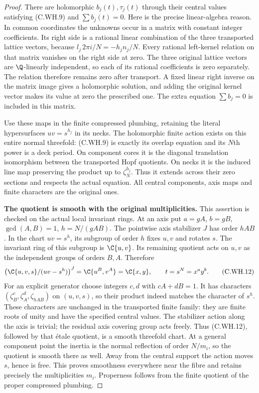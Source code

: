 \begin{proof}
There are holomorphic $b_j(t),\tau_j(t)$
through their central values satisfying
(C.WH.9) and $\sum b_j(t)=0$.
Here is the precise linear-algebra
reason. In common coordinates the
unknowns occur in a matrix with
constant integer coefficients.
Its right side is a rational linear
combination of the three transported
lattice vectors, because
$l_j\,2\pi i/N=-h_jn_j/N$.
Every rational left-kernel relation
on that matrix vanishes on the
right side at zero. The three
original lattice vectors are
$\Q$-linearly independent, so each
of its rational coefficients is
zero separately. The relation
therefore remains zero after
transport. A fixed linear right
inverse on the matrix image gives
a holomorphic solution, and adding
the original kernel vector makes
its value at zero the prescribed
one. The extra equation $\sum b_j=0$
is included in this matrix.

Use these maps in the finite
compressed plumbing, retaining the
literal hypersurfaces $uv=s^{h_j}$
in its necks. The holomorphic
finite action exists on this entire
normal threefold: (C.WH.9) is
exactly its overlap equation and
its $N$th power is a deck period.
On component cores it is the
diagonal translation isomorphism
between the transported Hopf
quotients. On necks it is the
induced line map preserving the
product up to $\zeta_N^{h_j}$.
Thus it extends across their
zero sections and respects the
actual equation. All central
components, axis maps and finite
characters are the original ones.

\par\medskip\noindent\textbf{The quotient is smooth with the original multiplicities.}
This assertion is checked on the
actual local invariant rings.
At an axis put $a=gA$, $b=gB$,
$\gcd(A,B)=1$, $h=N/(gAB)$.
The pointwise axis stabilizer
$J$ has order $hAB$. In the chart
$uv=s^h$, its subgroup of order
$h$ fixes $u,v$ and rotates $s$.
The invariant ring of this
subgroup is $\C\{u,v\}$.
Its remaining quotient acts on
$u,v$ as the independent groups
of orders $B,A$. Therefore
\[
 \bigl(\C\{u,v,s\}/(uv-s^h)\bigr)^J
           =\C\{u^B,v^A\}=\C\{x,y\},
 \qquad t=s^N=x^a y^b .
\tag{C.WH.12}
\]
For an explicit generator choose
integers $c,d$ with $cA+dB=1$.
It has characters
$(\zeta_B^c,\zeta_A^d,\zeta_{hAB})$
on $(u,v,s)$, so their product
indeed matches the character of
$s^h$. These characters are
unchanged in the transported
finite family: they are finite
roots of unity and have the
specified central values.
The stabilizer action along the
axis is trivial; the residual
axis covering group acts freely.
Thus (C.WH.12), followed by that
\'{e}tale quotient, is a smooth
threefold chart. At a general
component point the inertia is
the normal reflection of order
$N/m_i$, so the quotient is
smooth there as well. Away from
the central support the action
moves $s$, hence is free.
This proves smoothness everywhere
near the fibre and retains
precisely the multiplicities
$m_i$. Properness follows from
the finite quotient of the
proper compressed plumbing.


\end{proof}

